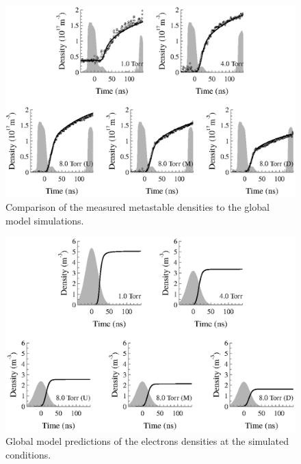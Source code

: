 \begin{figure}
  \centering
  \includegraphics{./chapters/modeling/figures/nmcomp.eps}
  \caption{Comparison of the measured metastable densities to the global model
  simulations.}
  \label{fig:nmcomp}
\end{figure}

\begin{figure}
  \centering
  \includegraphics{./chapters/modeling/figures/necomp.eps}
  \caption{Global model predictions of the electrons densities at the simulated
  conditions.}
  \label{fig:necomp}
\end{figure}

